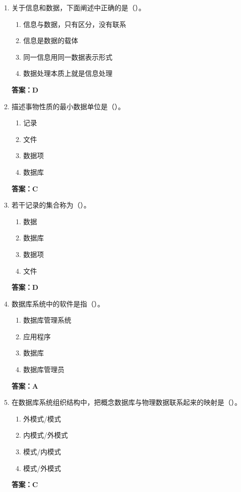 \documentclass[12pt, a4paper]{article}
\begin{document}
\begin{enumerate}[label=\arabic*.]
	\item 关于信息和数据，下面阐述中正确的是（\quad）。
	      \begin{enumerate}
		      \item 信息与数据，只有区分，没有联系
		      \item 信息是数据的载体
		      \item 同一信息用同一数据表示形式
		      \item 数据处理本质上就是信息处理
	      \end{enumerate}
	      \textbf{答案：D}

	\item 描述事物性质的最小数据单位是（\quad）。
	      \begin{enumerate}
		      \item 记录
		      \item 文件
		      \item 数据项
		      \item 数据库
	      \end{enumerate}
	      \textbf{答案：C}

	\item 若干记录的集合称为（\quad）。
	      \begin{enumerate}
		      \item 数据
		      \item 数据库
		      \item 数据项
		      \item 文件
	      \end{enumerate}
	      \textbf{答案：D}

	\item 数据库系统中的软件是指（\quad）。
	      \begin{enumerate}
		      \item 数据库管理系统
		      \item 应用程序
		      \item 数据库
		      \item 数据库管理员
	      \end{enumerate}
	      \textbf{答案：A}

	\item 在数据库系统组织结构中，把概念数据库与物理数据联系起来的映射是（\quad）。
	      \begin{enumerate}
		      \item 外模式/模式
		      \item 内模式/外模式
		      \item 模式/内模式
		      \item 模式/外模式
	      \end{enumerate}
	      \textbf{答案：C}


\end{enumerate}
\end{document}
